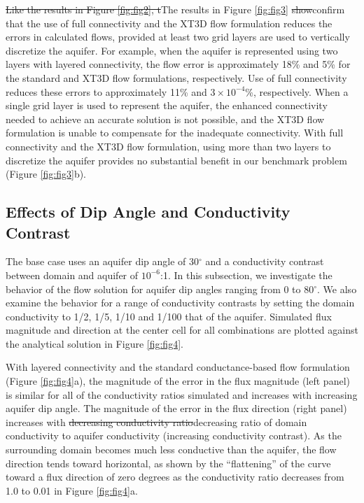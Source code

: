 \documentclass{article}
\begin{document}
{\color{red} \sout{Like the results in Figure \ref{fig:fig2}, t}T}he results in Figure \ref{fig:fig3} {\color{red} \sout{show}confirm} that the use of full connectivity and the XT3D flow formulation reduces the errors in calculated flows, provided at least two grid layers are used to vertically discretize the aquifer. {\color{red}For example, when the aquifer is represented using two layers with layered connectivity, the flow error is approximately 18\% and 5\% for the standard and XT3D flow formulations, respectively. Use of full connectivity reduces these errors to approximately 11\% and $3 \times 10^{-4}$\%, respectively.} When a single grid layer is used to represent the aquifer, the enhanced connectivity needed to achieve an accurate solution is not possible, and the XT3D flow formulation is unable to compensate for the inadequate connectivity. {\color{red} With full connectivity and the XT3D flow formulation, using more than two layers to discretize the aquifer provides no substantial benefit in our benchmark problem (Figure \ref{fig:fig3}b).}

\subsection*{Effects of Dip Angle and Conductivity Contrast}

The base case uses an aquifer dip angle of 30$^{\circ}$ and a conductivity contrast between domain and aquifer of $10^{-6}$:1. In this subsection, we investigate the behavior of the flow solution for aquifer dip angles ranging from 0 to 80$^{\circ}$. We also examine the behavior for a range of conductivity contrasts by setting the domain conductivity to 1/2, 1/5, 1/10 and 1/100 that of the aquifer. Simulated flux magnitude and direction at the center cell for all combinations are plotted against the analytical solution in Figure \ref{fig:fig4}. 

With layered connectivity and the standard conductance-based flow formulation (Figure \ref{fig:fig4}a), the magnitude of the error in the flux magnitude (left panel) is similar for all of the conductivity ratios simulated and increases with increasing aquifer dip angle. The magnitude of the error in the flux direction (right panel) increases with {\color{red} \sout{decreasing conductivity ratio}decreasing ratio of domain conductivity to aquifer conductivity (increasing conductivity contrast)}. As the surrounding domain becomes much less conductive than the aquifer, the flow direction tends toward horizontal{\color{red}, as shown by the ``flattening'' of the curve toward a flux direction of zero degrees as the conductivity ratio decreases from 1.0 to 0.01 in Figure \ref{fig:fig4}a}.
\end{document}
